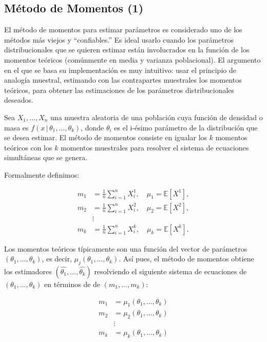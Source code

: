 \documentclass[9pt,twocolumn,twoside,]{pnas-new}
\begin{document}
\hypertarget{muxe9todo-de-momentos-casella2021statistical}{%
\subsection{Método de Momentos
(1)}\label{muxe9todo-de-momentos-casella2021statistical}}

El método de momentos para estimar parámetros es considerado uno de los
métodos más viejos y ``confiables.'' Es ideal usarlo cuando los
parámetros distribucionales que se quieren estimar están involucrados en
la función de los momentos teóricos (comúnmente en media y varianza
poblacional). El argumento en el que se basa su implementación es muy
intuitivo: usar el principio de analogía muestral, estimando con las
contrapartes muestrales los momentos teóricos, para obtener las
estimaciones de los parámetros distribucionales deseados.

Sea \(X_1, \ldots , X_n\) una muestra aleatoria de una población cuya
función de densidad o masa es
\(f(x \, | \, \theta_1, \ldots , \theta_k)\), donde \(\theta_i\) es el
i-ésimo parámetro de la distribución que se desea estimar. El método de
momentos consiste en igualar los \(k\) momentos teóricos con los \(k\)
momentos muestrales para resolver el sistema de ecuaciones simultáneas
que se genera.

Formalmente definimos:

\begin{equation*}
\begin{aligned}
m_{1} &=\frac{1}{n} \sum_{i=1}^{n} X_{i}^{1}, \quad \mu_{1}=\mathbb{E}[ X^{1}], \\
m_{2} &=\frac{1}{n} \sum_{i=1}^{n} X_{i}^{2}, \quad \mu_{2}=\mathbb{E}[ X^{2}], \\
& \vdots \\
m_{k} &=\frac{1}{n} \sum_{i=1}^{n} X_{i}^{k}, \quad \mu_{k}=\mathbb{E}[ X^{k}] .
\end{aligned}
\end{equation*}

Los momentos teóricos típicamente son una función del vector de
parámetros \((\theta_1, \ldots, \theta_k)\), es decir,
\(\mu_j(\theta_1, \ldots, \theta_k)\). Así pues, el método de momentos
obtiene los estimadores \((\hat{\theta_1}, \ldots, \hat{\theta_k})\)
resolviendo el siguiente sistema de ecuaciones de
\((\theta_1, \ldots, \theta_k)\) en términos de de
\((m_1, \ldots, m_k)\):

\begin{equation*}
    \begin{aligned}
m_{1} &=\mu_{1}\left(\theta_{1}, \ldots, \theta_{k}\right) \\
m_{2} &=\mu_{2}\left(\theta_{1}, \ldots, \theta_{k}\right) \\
& \vdots \\
m_{k} &=\mu_{k}\left(\theta_{1}, \ldots, \theta_{k}\right)
\end{aligned}
\end{equation*}
\end{document}
